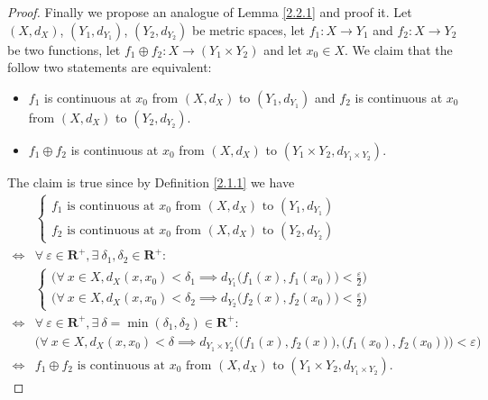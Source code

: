 \begin{proof}
    Finally we propose an analogue of Lemma \ref{2.2.1} and proof it.
    Let \((X, d_X)\), \((Y_1, d_{Y_1})\), \((Y_2, d_{Y_2})\) be metric spaces, let \(f_1 : X \to Y_1\) and \(f_2 : X \to Y_2\) be two functions, let \(f_1 \oplus f_2 : X \to (Y_1 \times Y_2)\) and let \(x_0 \in X\).
    We claim that the follow two statements are equivalent:
    \begin{itemize}
        \item \(f_1\) is continuous at \(x_0\) from \((X, d_X)\) to \((Y_1, d_{Y_1})\) and \(f_2\) is continuous at \(x_0\) from \((X, d_X)\) to \((Y_2, d_{Y_2})\).
        \item \(f_1 \oplus f_2\) is continuous at \(x_0\) from \((X, d_X)\) to \((Y_1 \times Y_2, d_{Y_1 \times Y_2})\).
    \end{itemize}
    The claim is true since by Definition \ref{2.1.1} we have
    \begin{align*}
             & \begin{cases}
            f_1 \text{ is continuous at } x_0 \text{ from } (X, d_X) \text{ to } (Y_1, d_{Y_1}) \\
            f_2 \text{ is continuous at } x_0 \text{ from } (X, d_X) \text{ to } (Y_2, d_{Y_2})
        \end{cases}                                                                                                                             \\
        \iff & \forall\ \varepsilon \in \mathbf{R}^+, \exists\ \delta_1, \delta_2 \in \mathbf{R}^+ :                                                                  \\
             & \begin{cases}
            \big(\forall\ x \in X, d_X(x, x_0) < \delta_1 \implies d_{Y_1}\big(f_1(x), f_1(x_0)\big) < \frac{\varepsilon}{2}) \\
            \big(\forall\ x \in X, d_X(x, x_0) < \delta_2 \implies d_{Y_2}\big(f_2(x), f_2(x_0)\big) < \frac{\varepsilon}{2})
        \end{cases}                                                                                                                             \\
        \iff & \forall\ \varepsilon \in \mathbf{R}^+, \exists\ \delta = \min(\delta_1, \delta_2) \in \mathbf{R}^+ :                                                   \\
             & \big(\forall\ x \in X, d_X(x, x_0) < \delta \implies d_{Y_1 \times Y_2}\Big(\big(f_1(x), f_2(x)\big), \big(f_1(x_0), f_2(x_0)\big)\Big) < \varepsilon) \\
        \iff & f_1 \oplus f_2 \text{ is continuous at } x_0 \text{ from } (X, d_X) \text{ to } (Y_1 \times Y_2, d_{Y_1 \times Y_2}).
    \end{align*}
\end{proof}

